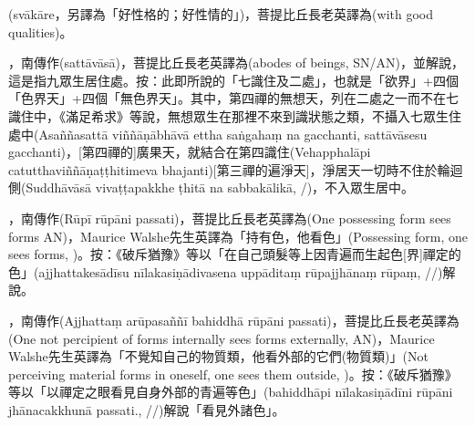 \startitemgroup[noteitems]
\item{}(svākāre，另譯為「好性格的；好性情的」)，菩提比丘長老英譯為(with good qualities)。
\stopitemgroup

\startitemgroup[noteitems]
\item{}，南傳作(sattāvāsā)，菩提比丘長老英譯為(abodes of beings, SN/AN)，並解說，這是指九眾生居住處。按：此即所說的「七識住及二處」，也就是「欲界」+四個「色界天」+四個「無色界天」。其中，第四禪的無想天，列在二處之一而不在七識住中，《滿足希求》等說，無想眾生在那裡不來到識狀態之類，不攝入七眾生住處中(Asaññasattā viññāṇābhāvā ettha saṅgahaṃ na gacchanti, sattāvāsesu gacchanti)，[第四禪的]廣果天，就結合在第四識住(Vehapphalāpi catutthaviññāṇaṭṭhitimeva bhajanti)[第三禪的遍淨天]，淨居天一切時不住於輪迴側(Suddhāvāsā vivaṭṭapakkhe ṭhitā na sabbakālikā, /)，不入眾生居中。
\stopitemgroup

\startitemgroup[noteitems]
\item{}，南傳作(Rūpī rūpāni passati)，菩提比丘長老英譯為(One possessing form sees forms AN)，Maurice Walshe先生英譯為「持有色，他看色」(Possessing form, one sees forms, )。按：《破斥猶豫》等以「在自己頭髮等上因青遍而生起色[界]禪定的色」(ajjhattakesādīsu nīlakasiṇādivasena uppāditaṃ rūpajjhānaṃ rūpaṃ, //)解說。
\stopitemgroup

\startitemgroup[noteitems]
\item{}，南傳作(Ajjhattaṃ arūpasaññī bahiddhā rūpāni passati)，菩提比丘長老英譯為(One not percipient of forms internally sees forms externally, AN)，Maurice Walshe先生英譯為「不覺知自己的物質類，他看外部的它們(物質類)」(Not perceiving material forms in oneself, one sees them outside, )。按：《破斥猶豫》等以「以禪定之眼看見自身外部的青遍等色」(bahiddhāpi nīlakasiṇādīni rūpāni jhānacakkhunā passati., //)解說「看見外諸色」。
\stopitemgroup

